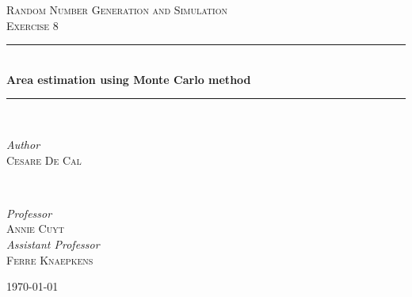 \documentclass{article}
\begin{document}

\begin{titlepage} %
	\newcommand{\HRule}{\rule{\linewidth}{0.5mm}}%
	
	\center %
	
	
	\textsc{\Large Random Number Generation and Simulation}\\[0.5cm] %
	
	\textsc{\large Exercise 8}\\[0.5cm] %
	
	
	\HRule\\[0.6cm]
	
	{\huge\bfseries Area estimation using Monte Carlo method}\\[0.25cm] %
	
	\HRule\\[1.5cm]
	
	
	\begin{minipage}{0.4\textwidth}
		\begin{flushleft}
			\large
			\textit{Author}\\
			\textsc{Cesare De Cal} %
		\end{flushleft}
	\end{minipage}
	~
	\begin{minipage}{0.4\textwidth}
		\begin{flushright}
			\large
			\textit{Professor}\\
			\textsc{Annie Cuyt}\\ %
			[0.25cm]
			\textit{Assistant Professor}\\
			\textsc{Ferre Knaepkens} %

		\end{flushright}
	\end{minipage}
		
	\vfill\vfill\vfill
	
	{\large\today}
		
	\vfill
	
\end{titlepage}
\end{document}
